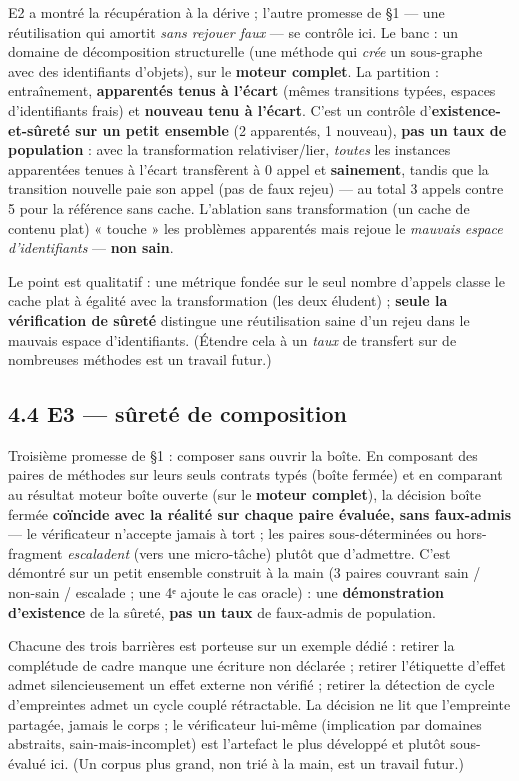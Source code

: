 \documentclass[11pt]{article}
\begin{document}
E2 a montré la récupération à la dérive ; l'autre promesse de §1 — une réutilisation qui amortit \emph{sans rejouer faux} — se contrôle ici. Le banc : un domaine de décomposition structurelle (une méthode qui \emph{crée} un sous-graphe avec des identifiants d'objets), sur le \textbf{moteur complet}. La partition : entraînement, \textbf{apparentés tenus à l'écart} (mêmes transitions typées, espaces d'identifiants frais) et \textbf{nouveau tenu à l'écart}. C'est un contrôle d'\textbf{existence-et-sûreté sur un petit ensemble} (2 apparentés, 1 nouveau), \textbf{pas un taux de population} : avec la transformation relativiser/lier, \emph{toutes} les instances apparentées tenues à l'écart transfèrent à 0 appel et \textbf{sainement}, tandis que la transition nouvelle paie son appel (pas de faux rejeu) — au total 3 appels contre 5 pour la référence sans cache. L'ablation sans transformation (un cache de contenu plat) « touche » les problèmes apparentés mais rejoue le \emph{mauvais espace d'identifiants} — \textbf{non sain}.

Le point est qualitatif : une métrique fondée sur le seul nombre d'appels classe le cache plat à égalité avec la transformation (les deux éludent) ; \textbf{seule la vérification de sûreté} distingue une réutilisation saine d'un rejeu dans le mauvais espace d'identifiants. (Étendre cela à un \emph{taux} de transfert sur de nombreuses méthodes est un travail futur.)

\subsection*{4.4 E3 — sûreté de composition}

Troisième promesse de §1 : composer sans ouvrir la boîte. En composant des paires de méthodes sur leurs seuls contrats typés (boîte fermée) et en comparant au résultat moteur boîte ouverte (sur le \textbf{moteur complet}), la décision boîte fermée \textbf{coïncide avec la réalité sur chaque paire évaluée, sans faux-admis} — le vérificateur n'accepte jamais à tort ; les paires sous-déterminées ou hors-fragment \emph{escaladent} (vers une micro-tâche) plutôt que d'admettre. C'est démontré sur un petit ensemble construit à la main (3 paires couvrant sain / non-sain / escalade ; une 4ᵉ ajoute le cas oracle) : une \textbf{démonstration d'existence} de la sûreté, \textbf{pas un taux} de faux-admis de population.

Chacune des trois barrières est porteuse sur un exemple dédié : retirer la complétude de cadre manque une écriture non déclarée ; retirer l'étiquette d'effet admet silencieusement un effet externe non vérifié ; retirer la détection de cycle d'empreintes admet un cycle couplé rétractable. La décision ne lit que l'empreinte partagée, jamais le corps ; le vérificateur lui-même (implication par domaines abstraits, sain-mais-incomplet) est l'artefact le plus développé et plutôt sous-évalué ici. (Un corpus plus grand, non trié à la main, est un travail futur.)
\end{document}
